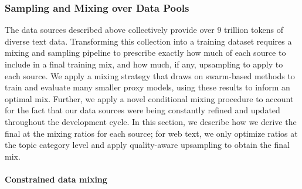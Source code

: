 \documentclass[table]{ai2style/ai2}
\begin{document}
\subsubsection{Sampling and Mixing over Data Pools}
\label{sec:combining-data-pools}
The data sources described above collectively provide over 9 trillion tokens of diverse text data. Transforming this collection into a training dataset requires a mixing and sampling pipeline to prescribe exactly how much of each source to include in a final training mix, and how much, if any, upsampling to apply to each source. We apply a mixing strategy that draws on swarm-based methods to train and evaluate many smaller proxy models, using these results to inform an optimal mix. Further, we apply a novel conditional mixing procedure to account for the fact that our data sources were being constantly refined and updated throughout the development cycle. In this section, we describe how we derive the final at the mixing ratios for each source; for web text, we only optimize ratios at the topic category level and apply quality-aware upsampling to obtain the final mix.

\paragraph{Constrained data mixing}
\end{document}
